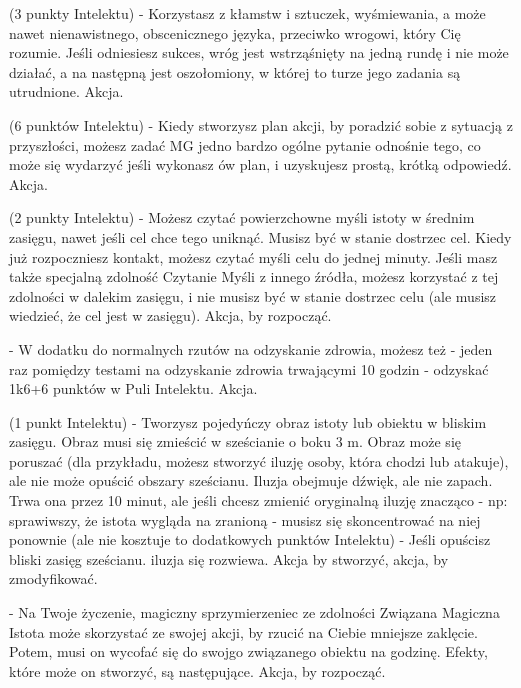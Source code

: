  (3 punkty Intelektu) - Korzystasz z kłamstw i sztuczek, wyśmiewania, a może nawet nienawistnego, obscenicznego języka, przeciwko wrogowi, który Cię rozumie. Jeśli odniesiesz sukces, wróg jest wstrząśnięty na jedną rundę i nie może działać, a na następną jest oszołomiony, w której to turze jego zadania są utrudnione. Akcja.

 (6 punktów Intelektu) - Kiedy stworzysz plan akcji, by poradzić sobie z sytuacją z przyszłości, możesz zadać MG jedno bardzo ogólne pytanie odnośnie tego, co może się wydarzyć jeśli wykonasz ów plan, i uzyskujesz prostą, krótką odpowiedź. Akcja. 

 (2 punkty Intelektu) - Możesz czytać powierzchowne myśli istoty w średnim zasięgu, nawet jeśli cel chce tego uniknąć. Musisz być w stanie dostrzec cel. Kiedy już rozpoczniesz kontakt, możesz czytać myśli celu do jednej minuty. Jeśli masz także specjalną zdolność Czytanie Myśli z innego źródła, możesz korzystać z tej zdolności w dalekim zasięgu, i nie musisz być w stanie dostrzec celu (ale musisz wiedzieć, że cel jest w zasięgu). Akcja, by rozpocząć. 

 - W dodatku do normalnych rzutów na odzyskanie zdrowia, możesz też - jeden raz pomiędzy testami na odzyskanie zdrowia trwającymi 10 godzin - odzyskać 1k6+6 punktów w Puli Intelektu. Akcja.

 (1 punkt Intelektu) - Tworzysz pojedyńczy obraz istoty lub obiektu w bliskim zasięgu. Obraz musi się zmieścić w sześcianie o boku 3 m. Obraz może się poruszać (dla przykładu, możesz stworzyć iluzję osoby, która chodzi lub atakuje), ale nie może opuścić obszary sześcianu. Iluzja obejmuje dźwięk, ale nie zapach. Trwa ona przez 10 minut, ale jeśli chcesz zmienić oryginalną iluzję znacząco - np: sprawiwszy, że istota wygląda na zranioną - musisz się skoncentrować na niej ponownie (ale nie kosztuje to dodatkowych punktów Intelektu) - Jeśli opuścisz bliski zasięg sześcianu. iluzja się rozwiewa. Akcja by stworzyć, akcja, by zmodyfikować. 

 - Na Twoje życzenie, magiczny sprzymierzeniec ze zdolności Związana Magiczna Istota może skorzystać ze swojej akcji, by rzucić na Ciebie mniejsze zaklęcie. Potem, musi on wycofać się do swojgo związanego obiektu na godzinę. Efekty, które może on stworzyć, są następujące. Akcja, by rozpocząć.

